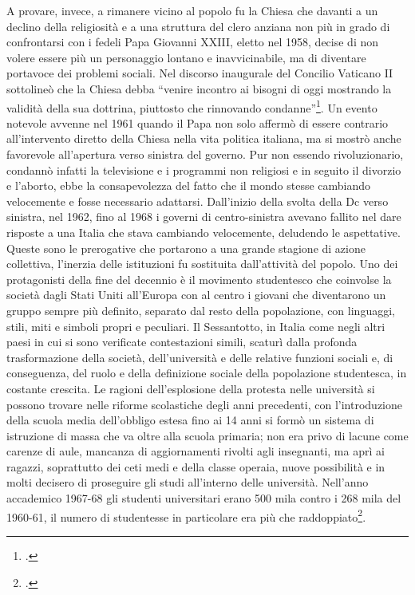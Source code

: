 A provare, invece, a rimanere vicino al popolo fu la Chiesa che davanti a un declino della religiosità e a una struttura del clero anziana non più in grado di confrontarsi con i fedeli Papa Giovanni XXIII, eletto nel 1958, decise di non volere essere più un personaggio lontano e inavvicinabile, ma di diventare portavoce dei problemi sociali.
Nel discorso inaugurale del Concilio Vaticano II sottolineò che la Chiesa debba \enquote{venire incontro ai bisogni di oggi mostrando la validità della sua dottrina, piuttosto che rinnovando condanne}\footcite{Papa}.
Un evento notevole avvenne nel 1961 quando il Papa non solo affermò di essere contrario all'intervento diretto della Chiesa nella vita politica italiana, ma si mostrò anche favorevole all'apertura verso sinistra del governo.
Pur non essendo rivoluzionario, condannò infatti la televisione e i programmi non religiosi e in seguito il divorzio e l'aborto, ebbe la consapevolezza del fatto che il mondo stesse cambiando velocemente e fosse necessario adattarsi.  
Dall'inizio della svolta della Dc verso sinistra, nel 1962, fino al 1968 i governi di centro-sinistra avevano fallito nel dare risposte a una Italia che stava cambiando velocemente, deludendo le aspettative.
Queste sono le prerogative che portarono a una grande stagione di azione collettiva, l'inerzia delle istituzioni fu sostituita dall'attività del popolo.
Uno dei protagonisti della fine del decennio è il movimento studentesco che coinvolse la società dagli Stati Uniti all'Europa con al centro i giovani che diventarono un gruppo sempre più definito, separato dal resto della popolazione, con linguaggi, stili, miti e simboli propri e peculiari.
Il Sessantotto, in Italia come negli altri paesi in cui si sono verificate contestazioni simili, scaturì dalla profonda trasformazione della società, dell’università e delle relative funzioni sociali e, di conseguenza, del ruolo e della definizione sociale della popolazione studentesca, in costante crescita. 
Le ragioni dell'esplosione della protesta nelle università si possono trovare nelle riforme scolastiche degli anni precedenti, con l'introduzione della scuola media dell'obbligo estesa fino ai 14 anni si formò un sistema di istruzione di massa che va oltre alla scuola primaria; non era privo di lacune come carenze di aule, mancanza di aggiornamenti rivolti agli insegnanti, ma aprì ai ragazzi, soprattutto dei ceti medi e della classe operaia, nuove possibilità e in molti decisero di proseguire gli studi all'interno delle università.
Nell'anno accademico 1967-68 gli studenti universitari erano 500 mila contro i 268 mila del 1960-61, il numero di studentesse in particolare era più che raddoppiato\footcite{ISTAT2}.
